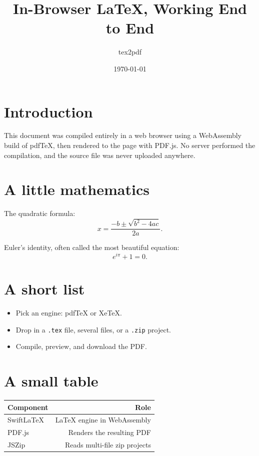 \documentclass[11pt]{article}
\title{In-Browser LaTeX, Working End to End}
\author{tex2pdf}
\date{\today}
\begin{document}
\maketitle

\section{Introduction}
This document was compiled entirely in a web browser using a WebAssembly build of
pdfTeX, then rendered to the page with PDF.js. No server performed the compilation,
and the source file was never uploaded anywhere.

\section{A little mathematics}
The quadratic formula:
\begin{equation}
  x = \frac{-b \pm \sqrt{b^{2} - 4ac}}{2a}.
\end{equation}

Euler's identity, often called the most beautiful equation:
\[
  e^{i\pi} + 1 = 0.
\]

\section{A short list}
\begin{itemize}
  \item Pick an engine: pdfTeX or XeTeX.
  \item Drop in a \texttt{.tex} file, several files, or a \texttt{.zip} project.
  \item Compile, preview, and download the PDF.
\end{itemize}

\section{A small table}
\begin{center}
\begin{tabular}{l r}
  \hline
  Component & Role \\
  \hline
  SwiftLaTeX & LaTeX engine in WebAssembly \\
  PDF.js & Renders the resulting PDF \\
  JSZip & Reads multi-file zip projects \\
  \hline
\end{tabular}
\end{center}
\end{document}
